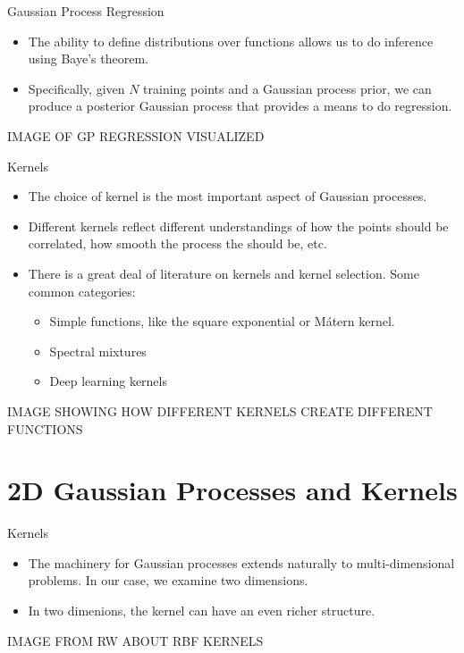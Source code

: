 \documentclass[10pt]{beamer}
\begin{document}
\begin{frame}{Gaussian Process Regression }
  \begin{itemize}
  \item The ability to define distributions over functions allows us to do inference using Baye's theorem. 
  \item Specifically, given $N$ training points and a Gaussian process prior, we can produce a posterior Gaussian process that provides a means to do regression. 
  \end{itemize}

  IMAGE OF GP REGRESSION VISUALIZED
\end{frame}

\begin{frame}{Kernels}
  \begin{itemize}
  \item The choice of kernel is the most important aspect of Gaussian processes. 
  \item Different kernels reflect different understandings of how the points should be correlated, how smooth the process the should be, etc. 
  \item There is a great deal of literature on kernels and kernel selection. Some common categories:
    \begin{itemize}
    \item Simple functions, like the square exponential or M\'atern kernel.
    \item Spectral mixtures
    \item Deep learning kernels
    \end{itemize}
  \end{itemize}

  IMAGE SHOWING HOW DIFFERENT KERNELS CREATE DIFFERENT FUNCTIONS

\end{frame}


\section[2D Regression]{2D Gaussian Processes and Kernels}
\label{sec:2d-gauss-proc}
\begin{frame}{Kernels}
  \begin{itemize}
  \item The machinery for Gaussian processes extends naturally to multi-dimensional problems. In our case, we examine two dimensions.
  \item In two dimenions, the kernel can have an even richer structure. 
  \end{itemize}


  IMAGE FROM RW ABOUT RBF KERNELS 

\end{frame}
\end{document}
